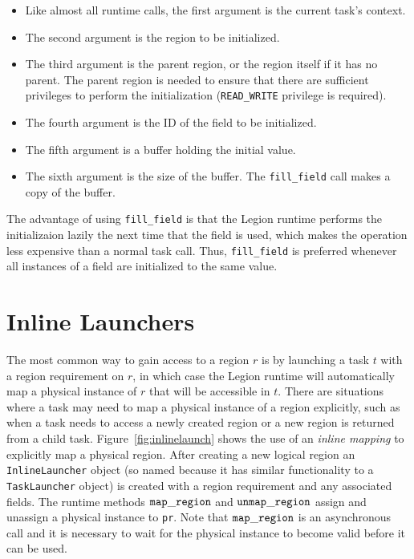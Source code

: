 \begin{itemize}

\item Like almost all runtime calls, the first argument is the current task's context.

\item The second argument is the region to be initialized.

\item The third argument is the parent region, or the region itself if it has no parent.  The parent region is needed
to ensure that there are sufficient privileges to perform the initialization ({\tt READ\_WRITE} privilege
is required).

\item The fourth argument is the ID of the field to be initialized.

\item The fifth argument is a buffer holding the initial value.

\item The sixth argument is the size of the buffer.  
The {\tt fill\_field} call makes a copy of the buffer.

\end{itemize}

The advantage of using {\tt fill\_field} is that the Legion runtime performs the initializaion lazily the next time that
the field is used, which makes the operation less expensive than a normal task call.  Thus, {\tt fill\_field} is preferred
whenever all instances of a field are initialized to the same value.


\section{Inline Launchers}
\label{sec:inlinelaunch}

The most common way to gain access to a region $r$ is by launching a
task $t$ with a region requirement on $r$, in which case the Legion
runtime will automatically map a physical instance of $r$ that will be
accessible in $t$.  There are situations where a task may need to map
a physical instance of a region explicitly, such as when a task needs
to access a newly created region or a new region is returned from a
child task.  Figure~\ref{fig:inlinelaunch} shows the use of an {\em
  inline mapping} to explicitly map a physical region.  After creating
a new logical region an {\tt InlineLauncher} object (so named because
it has similar functionality to a {\tt TaskLauncher} object) is
created with a region requirement and any associated fields.  The
runtime methods $\tt map\_region$ and $\tt unmap\_region$ assign and
unassign a physical instance to {\tt pr}.  Note that $\tt map\_region$
is an asynchronous call and it is necessary to wait for the physical
instance to become valid before it can be used.

